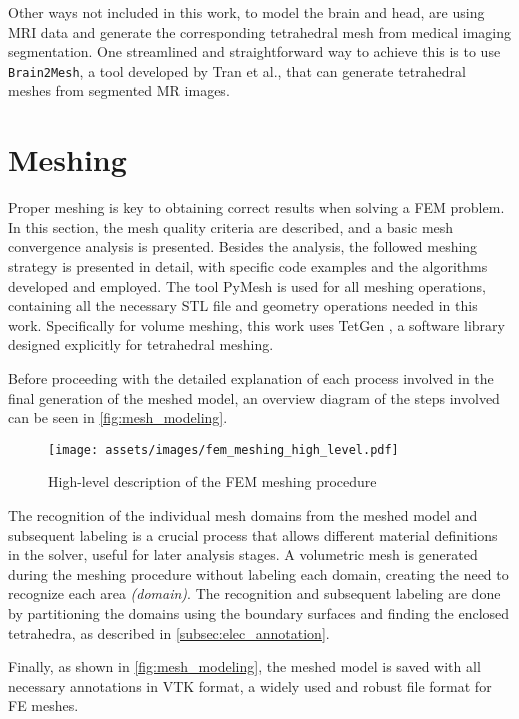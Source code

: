 Other ways not included in this work, to model the brain and head, are using \gls{MRI} data and generate the corresponding tetrahedral mesh from medical imaging segmentation. One streamlined and straightforward way to achieve this is to use \texttt{Brain2Mesh}, a tool developed by Tran et al.\cite{Tran2020}, that can generate tetrahedral meshes from segmented \gls{MR} images.

\section{Meshing}
\label{sec:fem_meshing}

Proper meshing is key to obtaining correct results when solving a \gls{FEM} problem. In this section, the mesh quality criteria are described, and a basic mesh convergence analysis is presented. Besides the analysis, the followed meshing strategy is presented in detail, with specific code examples and the algorithms developed and employed. The tool PyMesh \cite{pymesh} is used for all meshing operations, containing all the necessary \gls{STL} file and geometry operations needed in this work. Specifically for volume meshing, this work uses TetGen \cite{tetgen}, a software library designed explicitly for tetrahedral meshing.

Before proceeding with the detailed explanation of each process involved in the final generation of the meshed model, an overview diagram of the steps involved can be seen in \autoref{fig:mesh_modeling}.

\begin{figure}[H]
    \centering
    \texttt{[image: assets/images/fem\_meshing\_high\_level.pdf]}
    \caption{High-level description of the \gls{FEM} meshing procedure}
    \label{fig:mesh_modeling}
\end{figure}

\noindent The recognition of the individual mesh domains from the meshed model and subsequent labeling is a crucial process that allows different material definitions in the solver, useful for later analysis stages. A volumetric mesh is generated during the meshing procedure without labeling each domain, creating the need to recognize each area \textit{(domain)}. The recognition and subsequent labeling are done by partitioning the domains using the boundary surfaces and finding the enclosed tetrahedra, as described in \ref{subsec:elec_annotation}.

Finally, as shown in \autoref{fig:mesh_modeling}, the meshed model is saved with all necessary annotations in \gls{VTK} format, a widely used and robust file format for \gls{FE} meshes.

